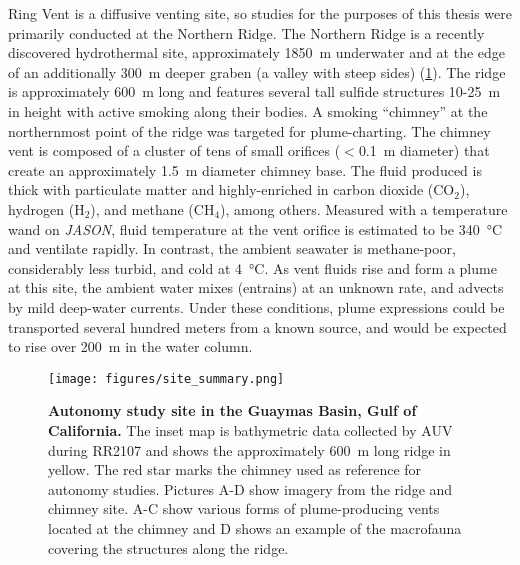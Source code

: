 Ring Vent is a diffusive venting site\autocite{teske2019characteristics}, so \Sentry studies for the purposes of this thesis were primarily conducted at the Northern Ridge. The Northern Ridge is a recently discovered hydrothermal site\autocite{soule2018exploration, geilert2018formation}, approximately \SI{1850}{\meter} underwater and at the edge of an additionally \SI{300}{\meter} deeper graben (a valley with steep sides) (\cref{fig:site}). The ridge is approximately \SI{600}{\meter} long and features several tall sulfide structures 10-\SI{25}{\meter} in height with active smoking along their bodies. A smoking ``chimney'' at the northernmost point of the ridge was targeted for plume-charting. The chimney vent is composed of a cluster of tens of small orifices ($<$\SI{0.1}{\meter} diameter) that create an approximately \SI{1.5}{\meter} diameter chimney base. The fluid produced is thick with particulate matter and highly-enriched in carbon dioxide (CO$_2$), hydrogen (H$_2$), and methane (CH$_4$), among others. Measured with a temperature wand on \emph{JASON}, fluid temperature at the vent orifice is estimated to be \SI{340}{\celsius} and ventilate rapidly. In contrast, the ambient seawater is methane-poor, considerably less turbid, and cold at \SI{4}{\celsius}. As vent fluids rise and form a plume at this site, the ambient water mixes (entrains) at an unknown rate, and advects by mild deep-water currents. Under these conditions, plume expressions could be transported several hundred meters from a known source, and would be expected to rise over \SI{200}{\meter} in the water column\autocite{speer1989model}.


\begin{figure}[!ht]
    \centering
    \texttt{[image: figures/site\_summary.png]}
    \caption{\textbf{Autonomy study site in the Guaymas Basin, Gulf of California.} The inset map is bathymetric data collected by AUV \Sentry during RR2107 and shows the approximately \SI{600}{\meter} long ridge in yellow. The red star marks the chimney used as reference for autonomy studies. Pictures A-D show imagery from the ridge and chimney site. A-C show various forms of plume-producing vents located at the chimney and D shows an example of the macrofauna covering the structures along the ridge.}
    \label{fig:site}
\end{figure}
 

